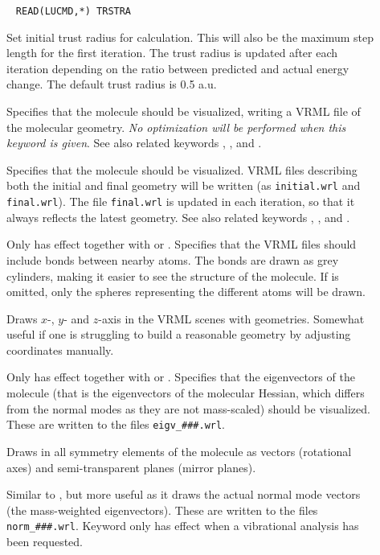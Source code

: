 \begin{description}
\item[]\verb| |
\newline
\verb|READ(LUCMD,*) TRSTRA|

Set initial trust radius for calculation. This
will also be the
maximum step length for the first iteration. The trust radius is
updated after each iteration depending on the ratio between predicted
and actual energy change. The default trust radius is 0.5 a.u.

\item[]
Specifies that the molecule should be
visualized,
writing a VRML file of the molecular geometry. {\em{No optimization
will be performed when this keyword is given}}. See also related
keywords , ,  and .

\item[]
Specifies that the molecule should be
visualized. VRML files describing
both the initial and final geometry
will be written (as \verb|initial.wrl| and \verb|final.wrl|). The file
\verb|final.wrl| is  updated in each iteration, so that it always
reflects the latest geometry. See also related keywords ,
,  and .

\item[]
Only has effect together with  or . Specifies
that the VRML files should include bonds between nearby
atoms. The
bonds are drawn as grey cylinders, making it easier to see the
structure of the molecule. If  is omitted, only the
spheres representing the different atoms will be drawn.

\item[]
Draws $x$-, $y$- and $z$-axis in the VRML scenes with
geometries. Somewhat useful if one is struggling to build a reasonable
geometry by adjusting coordinates manually.

\item[]
Only has effect together with  or
.
Specifies that the eigenvectors of the molecule (that is the
eigenvectors of the molecular Hessian, which differs from the normal modes as
they are not mass-scaled) should be visualized. These are written to
the files \verb|eigv_###.wrl|.

\item[]
Draws in all symmetry elements of the molecule as vectors (rotational
axes) and semi-transparent planes (mirror planes).

\item[]
Similar to , but more useful as it draws the actual normal
mode vectors (the mass-weighted eigenvectors). These are written to
the files \verb|norm_###.wrl|. Keyword only has effect when a
vibrational analysis has been requested.

\end{description}


